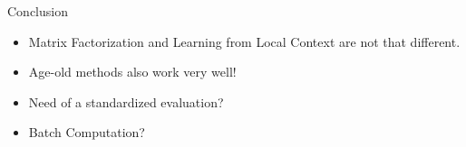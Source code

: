 \begin{frame}{Conclusion}
  \begin{itemize}[<+->]
  \item Matrix Factorization and Learning from Local Context are not that different.
  \item Age-old methods also work very well!
  \item Need of a standardized evaluation?
  \item Batch Computation?
  \end{itemize}
\end{frame}

